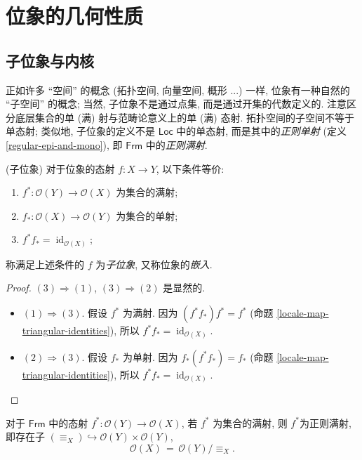 \section{位象的几何性质}

\subsection{子位象与内核}

正如许多 ``空间'' 的概念 (拓扑空间, 向量空间, 概形 ...) 一样, 位象有一种自然的 ``子空间'' 的概念; 当然, 子位象不是通过点集, 而是通过开集的代数定义的. 注意区分底层集合的单 (满) 射与范畴论意义上的单 (满) 态射. 拓扑空间的子空间不等于单态射; 类似地, 子位象的定义不是 $\mathsf {Loc}$ 中的单态射, 而是其中的\emph{正则单射} (定义 \ref{regular-epi-and-mono}), 即 $\mathsf {Frm}$ 中的\emph{正则满射}.

\begin{propdef}
	[label={sublocales}]
	{(子位象)}
	对于位象的态射 $f\colon X\to Y$, 以下条件等价:
	\begin{enumerate}
		[(1)]
		\item $f^*\colon \mathcal O(Y)\to\mathcal O(X)$ 为集合的满射;
		\item $f_*\colon \mathcal O(X)\to\mathcal O(Y)$ 为集合的单射;
		\item $f^*f_* = \operatorname{id}_{\mathcal O(X)}$;
	\end{enumerate}
	称满足上述条件的 $f$ 为\emph{子位象}, 又称位象的\emph{嵌入}.
\end{propdef}
\begin{proof}
	$(3)\Rightarrow (1)$, $(3)\Rightarrow (2)$ 是显然的.
	\begin{itemize}
		\item $(1)\Rightarrow (3)$. 假设 $f^*$ 为满射. 因为 $(f^*f_*)f^* = f^*$ (命题 \ref{locale-map-triangular-identities}), 所以 $f^*f_*=\operatorname{id}_{\mathcal O(X)}$.
		\item $(2)\Rightarrow (3)$. 假设 $f_*$ 为单射. 因为 $f_*(f^*f_*) = f_*$ (命题 \ref{locale-map-triangular-identities}), 所以 $f^*f_*=\operatorname{id}_{\mathcal O(X)}$.
	\end{itemize}
\end{proof}


\begin{prop}
	{}
	对于 $\mathsf {Frm}$ 中的态射 $f^*\colon \mathcal O(Y)\to \mathcal O(X)$, 若 $f^*$ 为集合的满射, 则 $f^*$为正则满射, 即存在子\fm{} $(\equiv_X)\hookrightarrow \mathcal O(Y)\times\mathcal O(Y)$, $$\mathcal O(X) \,=\, \mathcal O(Y) \big/ \!\equiv_X.$$
\end{prop}

